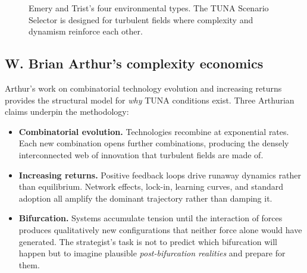 \documentclass[11pt,a4paper]{article}
\begin{document}
\begin{figure}[H]
\centering
{}
\caption{Emery and Trist's four environmental types. The TUNA Scenario Selector is designed for turbulent fields where complexity and dynamism reinforce each other.}
\end{figure}

\subsection{W. Brian Arthur's complexity economics}

Arthur's work on combinatorial technology evolution and increasing returns provides the structural model for \emph{why} TUNA conditions exist. Three Arthurian claims underpin the methodology:

\begin{itemize}[leftmargin=*]
  \item \textbf{Combinatorial evolution.} Technologies recombine at exponential rates. Each new combination opens further combinations, producing the densely interconnected web of innovation that turbulent fields are made of.
  \item \textbf{Increasing returns.} Positive feedback loops drive runaway dynamics rather than equilibrium. Network effects, lock-in, learning curves, and standard adoption all amplify the dominant trajectory rather than damping it.
  \item \textbf{Bifurcation.} Systems accumulate tension until the interaction of forces produces qualitatively new configurations that neither force alone would have generated. The strategist's task is not to predict which bifurcation will happen but to imagine plausible \emph{post-bifurcation realities} and prepare for them.
\end{itemize}
\end{document}
